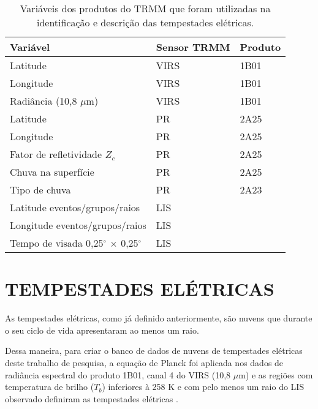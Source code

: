 \begin{table}[!h]
\centering
\small
\caption{Variáveis dos produtos do TRMM que foram utilizadas na identificação e descrição das tempestades elétricas.}
\label{varsTRMM}
\renewcommand {\tabularxcolumn }[1]{ >{\arraybackslash }m{#1}}
\begin{tabularx}{\textwidth}{ p{7cm} W W }
\hline
\hline
\textbf{Variável} & \textbf{Sensor TRMM} & \textbf{Produto} \\[1.5pt]
\hline
 Latitude & VIRS & 1B01 \\[1.5pt]
Longitude & VIRS & 1B01 \\[1.5pt]
 Radiância (10,8 $\mu$m) & VIRS & 1B01 \\[1.5pt]
Latitude & PR & 2A25 \\[1.5pt]
 Longitude & PR & 2A25 \\[1.5pt]
Fator de refletividade $Z_c$ & PR & 2A25 \\[1.5pt]
Chuva na superfície  & PR & 2A25 \\[1.5pt]
 Tipo de chuva  &  PR  & 2A23 \\[1.5pt]
Latitude eventos/grupos/raios & LIS &  \cite{rachel} \\[1.5pt]
 Longitude eventos/grupos/raios&LIS& \cite{rachel} \\[1.5pt]
Tempo de visada 0,25$^{\circ}$ $\times$ 0,25$^{\circ}$ & LIS &  \cite{rachel} \\

\hline
\end{tabularx} 
\end{table} 
 

\section{TEMPESTADES ELÉTRICAS}
\label{identificaTempestades}


As tempestades elétricas, como já definido anteriormente, são nuvens que durante o seu ciclo de vida apresentaram ao menos um raio.

Dessa maneira, para criar o banco de dados de nuvens de tempestades elétricas deste trabalho de pesquisa, a equação de Planck foi aplicada nos dados de radiância espectral do produto 1B01, canal 4 do VIRS (10,8 $\mu$m) e as regiões com temperatura de brilho ($T_b$) inferiores à 258 K e com pelo menos um raio do LIS observado definiram as tempestades elétricas \cite{morales2003}.


